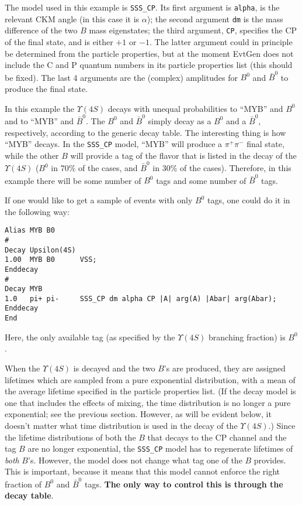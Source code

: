 The model used in this example is {\tt SSS\_CP}.  Its first argument is {\tt alpha}, is the
relevant CKM angle (in this case it is $\alpha$); the second argument {\tt dm} is
the mass difference of the two $B$ mass eigenstates; the third
argument, {\tt CP}, specifies the CP of the final state, and is either $+1$ or $-1$.
The latter argument could in principle be determined from the particle properties, but at 
the moment EvtGen does not include the C and P quantum numbers in its particle properties
list (this should be fixed). The last 4 arguments are the (complex) amplitudes for 
$B^0$ and $\bar B^0$ to produce the final state.

In this example the $\Upsilon(4S)$ decays with unequal
probabilities to ``MYB'' and $B^0$  and to ``MYB'' and  $\bar B^0$. The 
$B^0$ and $\bar B^0$ simply decay as a $B^0$ and a $\bar B^0$,
respectively, according to the generic decay table.  The interesting
thing is how ``MYB'' decays.  In the {\tt SSS\_CP} model, ``MYB'' will produce a
$\pi^+ \pi^-$ final state, while the other $B$ will provide
a tag of the flavor that is listed in the decay of the $\Upsilon(4S)$ ($B^0$ in 70\% 
of the cases, and $\bar B^0$ in 30\% of the cases).  Therefore, in this example there will
be some number of $B^0$ tags and some number of $\bar B^0$ tags. 
  
If one would like to get a sample of events with only $B^0$ tags, 
one could do it in the following way:
\begin{verbatim}
Alias MYB B0
#
Decay Upsilon(4S)
1.00  MYB B0      VSS;
Enddecay
#
Decay MYB
1.0   pi+ pi-     SSS_CP dm alpha CP |A| arg(A) |Abar| arg(Abar);
Enddecay
End
\end{verbatim}

Here, the only available tag (as specified by the $\Upsilon(4S)$ branching fraction) is $B^{0}$.

When the $\Upsilon(4S)$ is decayed and the two $B$'s are produced,
they are assigned lifetimes which are sampled from a pure exponential
distribution, with a mean of the average lifetime specified
in the particle properties list. (If the decay model is one that
includes the effects of mixing, the time distribution is no longer
a pure exponential; see the previous section.  However, as will be
evident below, it doesn't matter what time distribution is used in
the decay of the $\Upsilon(4S)$.)  Since the lifetime distributions
of both the $B$ that decays to the CP channel and the tag $B$ are
no longer exponential, the {\tt SSS\_CP} model has to regenerate 
lifetimes of {\it both} $B$'s. However, the model does not change what
tag one of the $B$ provides. This is important, because it means that this model
cannot enforce the right fraction of $B^0$ and $\bar B^0$ tags.  {\bf The only way to control this is through the decay table}.

